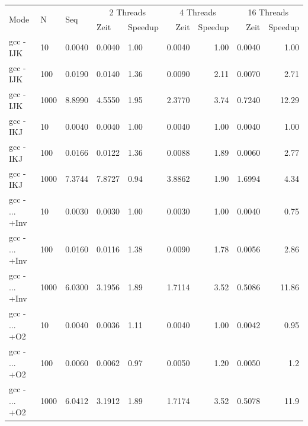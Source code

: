 \documentclass{report}
\begin{document}
			\begin{center}
			\begin{tabular}{|l|p{1cm}|p{1cm}|p{1cm}|p{1.5cm}|r|r|r|r|}
				\hline
			\multirow{2}{*}{Mode} & \multirow{2}{*}{N} & \multirow{2}{*}{Seq} & \multicolumn{2}{|c|}{2 Threads} & \multicolumn{2}{|c|}{4 Threads} & \multicolumn{2}{|c|}{16 Threads} \\
				& & & Zeit & Speedup & Zeit & Speedup & Zeit & Speedup \\
				\hline
				gcc - IJK & 10 & 		   0.0040  &     0.0040  &  1.00&      0.0040   & 1.00 &      0.0040  &  1.00\\
				
				gcc - IJK & 100 &           0.0190  &     0.0140  &  1.36&      0.0090   & 2.11&      0.0070  & 2.71\\
				
				gcc - IJK & 1000 &          8.8990  &     4.5550  &  1.95&        2.3770   & 3.74&       0.7240  & 12.29\\
				\hline
				gcc - IKJ  & 10 & 			0.0040  & 	 0.0040  & 1.00 & 	  0.0040  &  1.00&			0.0040 & 1.00\\
				
				gcc - IKJ & 100 &			0.0166  &     0.0122  &  1.36&		 0.0088  & 1.89&         0.0060  & 2.77\\
				
				gcc - IKJ & 1000 & 			7.3744  & 	 7.8727  & 0.94& 	  3.8862 & 1.90&         1.6994  & 4.34\\
				\hline
				gcc - ... +Inv & 10 &      0.0030  &     0.0030  & 1.00&       0.0030  & 1.00&        0.0040  & 0.75\\
				gcc - ... +Inv & 100 &	    0.0160  &     0.0116  & 1.38&       0.0090  & 1.78&			0.0056 & 2.86\\
				gcc - ... +Inv & 1000 & 	6.0300  &	3.1956  & 1.89&			1.7114 & 3.52&		0.5086 & 11.86\\
				\hline
				gcc - ... +O2 & 10 &  0.0040  &     0.0036  &  1.11&      0.0040   & 1.00&      0.0042  &  0.95\\
				 
				gcc - ... +O2 & 100 & 0.0060  &	  0.0062  &  0.97 &		0.0050  & 1.20 &        0.0050  &  1.2\\
				
				gcc - ... +O2 & 1000 & 6.0412  & 	3.1912 & 1.89 &       1.7174  & 3.52 &		  0.5078 & 11.9\\
				\hline
			\end{tabular}
		\end{center}
\end{document}
